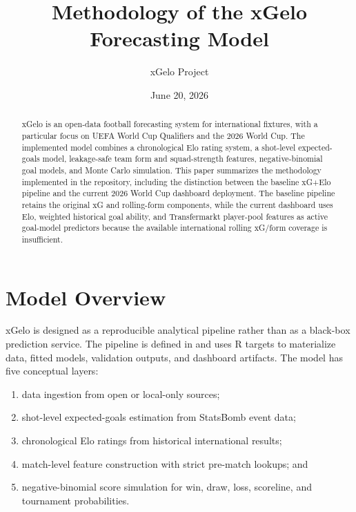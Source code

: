 \documentclass[11pt]{article}
\title{Methodology of the xGelo Forecasting Model}
\author{xGelo Project}
\date{June 20, 2026}
\begin{document}
\maketitle

\begin{abstract}
xGelo is an open-data football forecasting system for international fixtures,
with a particular focus on UEFA World Cup Qualifiers and the 2026 World Cup. The
implemented model combines a chronological Elo rating system, a shot-level
expected-goals model, leakage-safe team form and squad-strength features,
negative-binomial goal models, and Monte Carlo simulation. This paper summarizes
the methodology implemented in the repository, including the distinction between
the baseline xG+Elo pipeline and the current 2026 World Cup dashboard deployment.
The baseline pipeline retains the original xG and rolling-form components, while
the current dashboard uses Elo, weighted historical goal ability, and
Transfermarkt player-pool features as active goal-model predictors because the
available international rolling xG/form coverage is insufficient.
\end{abstract}

\section{Model Overview}

xGelo is designed as a reproducible analytical pipeline rather than as a
black-box prediction service. The pipeline is defined in  and
uses R targets to materialize data, fitted models, validation outputs, and
dashboard artifacts. The model has five conceptual layers:

\begin{enumerate}[leftmargin=*]
  \item data ingestion from open or local-only sources;
  \item shot-level expected-goals estimation from StatsBomb event data;
  \item chronological Elo ratings from historical international results;
  \item match-level feature construction with strict pre-match lookups; and
  \item negative-binomial score simulation for win, draw, loss, scoreline, and
  tournament probabilities.
\end{enumerate}
\end{document}
